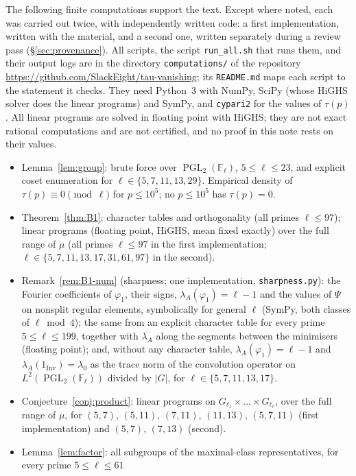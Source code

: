 \documentclass[11pt]{amsart}
\theoremstyle{definition}
\theoremstyle{remark}
\newcommand{\F}{\mathbb{F}}
\DeclareMathOperator{\PGL}{PGL}
\newcommand{\Inv}{\mathrm{Inv}}
\begin{document}
The following finite computations support the text. Except where noted, each was carried out twice, with
independently written code: a first implementation, written with the material, and a second one, written separately
during a review pass (\S\ref{sec:provenance}). All scripts, the script \texttt{run\_all.sh} that runs them, and
their output logs are in the directory \texttt{computations/} of the repository
\url{https://github.com/SlackEight/tau-vanishing}; its \texttt{README.md} maps each script to the statement it checks.
They need Python~3 with NumPy, SciPy (whose HiGHS solver does the linear programs) and SymPy, and \texttt{cypari2}
for the values of $\tau(p)$. All linear programs are solved in floating point with HiGHS; they are not exact rational
computations and are not certified, and no proof in this note rests on their values.
\begin{itemize}[leftmargin=*]
\item Lemma~\ref{lem:group}: brute force over $\PGL_2(\F_\ell)$, $5\le\ell\le23$, and explicit coset enumeration for
  $\ell\in\{5,7,11,13,29\}$. Empirical density of $\tau(p)\equiv0\pmod\ell$ for $p\le10^5$; no $p\le10^5$ has $\tau(p)=0$.
\item Theorem~\ref{thm:B1}: character tables and orthogonality (all primes $\ell\le97$); linear programs
  (floating point, HiGHS, mean fixed exactly) over the full range of $\mu$ (all primes $\ell\le97$ in the first implementation; $\ell\in\{5,7,11,13,17,31,61,97\}$ in
  the second).
\item Remark~\ref{rem:B1-num} (sharpness; one implementation, \texttt{sharpness.py}): the Fourier coefficients of
  $\varphi_1$, their signs, $\lambda_A(\varphi_1)=\ell-1$ and the values of $\Psi$ on nonsplit regular elements,
  symbolically for general $\ell$ (SymPy, both classes of $\ell\bmod4$); the same from an explicit character table for
  every prime $5\le\ell\le199$, together with $\lambda_A$ along the segments between the minimisers (floating point);
  and, without any character table, $\lambda_A(\varphi_1)=\ell-1$ and $\lambda_A(1_{\Inv})=\lambda_0$ as the trace norm
  of the convolution operator on $L^2(\PGL_2(\F_\ell))$ divided by $|G|$, for $\ell\in\{5,7,11,13,17\}$.
\item Conjecture~\ref{conj:product}: linear programs on $G_{\ell_1}\times\dots\times G_{\ell_r}$, over the full
  range of $\mu$, for $(5,7)$, $(5,11)$, $(7,11)$, $(11,13)$, $(5,7,11)$ (first implementation) and $(5,7)$, $(7,13)$
  (second).
\item Lemma~\ref{lem:factor}: all subgroups of the maximal-class representatives, for every prime $5\le\ell\le61$

\end{itemize}
\end{document}
